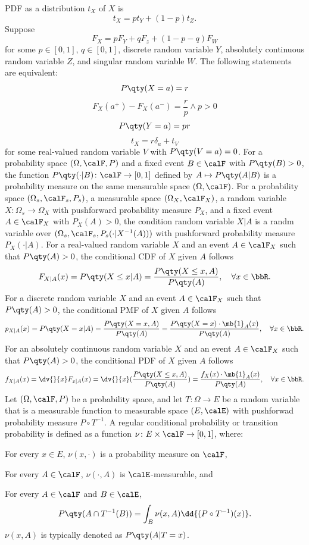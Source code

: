 \documentclass[a4paper,12pt]{report}
\begin{document}
PDF as a distribution $t_X$ of $X$ is
\[t_X=pt_Y+(1-p)t_Z.\]
Suppose
\[F_X=pF_Y+qF_z+(1-p-q)F_W\]
for some $p\in[0,1]$, $q\in[0,1]$, discrete random variable $Y$, absolutely continuous random variable $Z$, and singular random variable $W$. The following statements are equivalent:
\[P\qty(X=a)=r\]
\[F_X(a^+)-F_X(a^-)=\frac{r}{p}\land p>0\]
\[P\qty(Y=a)=pr\]
\[t_X=r\delta_a+t_V\]
for some real-valued random variable $V$ with $P\qty(V=a)=0$.
For a probability space $(\Omega,\calF,P)$ and a fixed event $B\in\calF$ with $P\qty(B)>0$, the function $P\qty(\cdot|B)\colon\calF\to[0,1]$ defined by $A\mapsto P\qty(A|B)$ is a probability measure on the same measurable space $(\Omega,\calF)$.
For a probability space $(\Omega_s,\calF_s,P_s)$, a measurable space $(\Omega_X,\calF_X)$, a random variable $X\colon\Omega_s\to\Omega_X$ with pushforward probability measure $P_X$, and a fixed event $A\in\calF_X$ with $P_X(A)>0$, the condition random variable $X|A$ is a randm variable over $(\Omega_s,\calF_s,P_s(\cdot|X^{-1}(A)))$ with pushforward probability measure $P_X(\cdot|A)$.
For a real-valued random variable $X$ and an event $A\in\calF_X$ such that $P\qty(A)>0$, the conditional CDF of $X$ given $A$ follows
\[F_{X|A}(x)=P\qty(X\le x|A)=\frac{P\qty(X\le x,A)}{P\qty(A)},\quad\forall x\in\bbR.\]
For a discrete random variable $X$ and an event $A\in\calF_X$ such that $P\qty(A)>0$, the conditional PMF of $X$ given $A$ follows
\[p_{X|A}(x)=P\qty(X=x|A)=\frac{P\qty(X=x,A)}{P\qty(A)}=\frac{P\qty(X=x)\cdot\mb{1}_A(x)}{P\qty(A)},\quad\forall x\in\bbR.\]
For an absolutely continuous random variable $X$ and an event $A\in\calF_X$ such that $P\qty(A)>0$, the conditional PDF of $X$ given $A$ follows
\[f_{X|A}(x)=\dv{}{x}F_{x|A}(x)=\dv{}{x}(\frac{P\qty(X\le x,A)}{P\qty(A)})=\frac{f_X(x)\cdot\mb{1}_A(x)}{P\qty(A)},\quad\forall x\in\bbR.\]
Let $(\Omega,\calF,P)$ be a probability space, and let $T\colon\Omega\to E$ be a random variable that is a measurable function to measurable space $(E,\calE)$ with pushforwad probability measure $P\circ T^{-1}$. A regular conditional probability or transition probability is defined as a function $\nu\colon E\times\calF\to[0,1]$, where:
\bit
\item For every $x\in E$, $\nu(x,\cdot)$ is a probability measure on $\calF$,
\item For every $A\in\calF$, $\nu(\cdot,A)$ is $\calE$-measurable, and
\item For every $A\in\calF$ and $B\in\calE$,
\[P\qty(A\cap T^{-1}(B))=\int_B\nu(x,A)\dd{(P\circ T^{-1})(x)}.\]
\eit
$\nu(x,A)$ is typically denoted as $P\qty(A|T=x)$.
\end{document}

